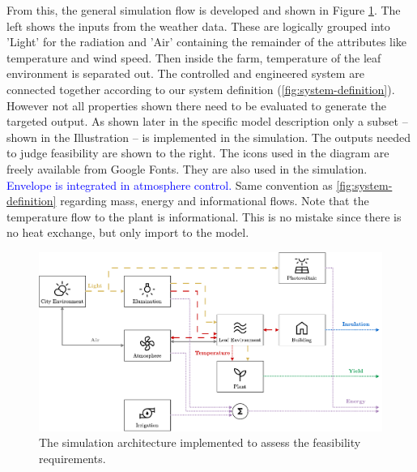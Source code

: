 From this, the general simulation flow is developed and shown in Figure \ref{fig:simulation-architecture}.
The left shows the inputs from the weather data.
These are logically grouped into 'Light' for the radiation and 'Air' containing the remainder of the attributes like temperature and wind speed.
Then inside the farm, temperature of the leaf environment is separated out.
The controlled and engineered system are connected together according to our system definition (\ref{fig:system-definition}).
However not all properties shown there need to be evaluated to generate the targeted output.
As shown later in the specific model description only a subset -- shown in the Illustration -- is implemented in the simulation.
The outputs needed to judge feasibility are shown to the right.
The icons used in the diagram are freely available from Google Fonts.
They are also used in the simulation.
\textcolor{Blue}{Envelope is integrated in atmosphere control.}
Same convention as \ref{fig:system-definition} regarding mass, energy and informational flows.
Note that the temperature flow to the plant is informational.
This is no mistake since there is no heat exchange, but only import to the model.



\begin{figure}[htbp]
  \centering
  \includegraphics[width=\textwidth]{img/simulation/simulation-architecture.pdf}
  \caption{The simulation architecture implemented to assess the feasibility requirements.}
  \label{fig:simulation-architecture}
\end{figure}

